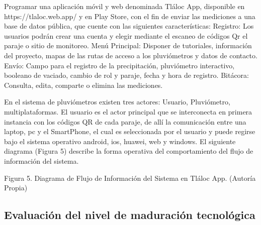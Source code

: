 Programar una aplicación móvil y web denominada Tláloc App, disponible en https://tlaloc.web.app/ y en Play Store, con el fin de enviar las mediciones a una base de datos pública, que cuente con las siguientes características:
Registro: Los usuarios podrán crear una cuenta y elegir mediante el escaneo de códigos Qr el paraje o sitio de monitoreo.
Menú Principal: Disponer de tutoriales, información del proyecto, mapas de las rutas de acceso a los pluviómetros y datos de contacto.
Envío: Campo para el registro de la precipitación, pluviómetro interactivo, booleano de vaciado, cambio de rol y paraje, fecha y hora de registro.
Bitácora: Consulta, edita, comparte o elimina las mediciones.

En el sistema de pluviómetros existen tres actores: Usuario, Pluviómetro, multiplataformas. El usuario es el actor principal que se interconecta en primera instancia con los códigos QR de cada paraje, de allí la comunicación entre una laptop, pc y el SmartPhone, el cual es seleccionada por el usuario y puede regirse bajo el sistema operativo android, ios, huawei, web y windows. El siguiente diagrama (Figura 5) describe la forma operativa del comportamiento del flujo de información del sistema.


Figura 5. Diagrama de Flujo de Información del Sistema en Tláloc App. (Autoría Propia)















\subsection{Evaluación del nivel de maduración tecnológica}




 




























